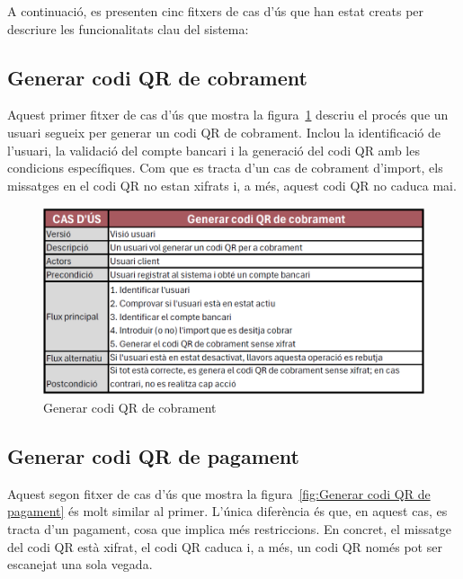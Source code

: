 \documentclass[a4paper,12pt,twoside]{ThesisStyle}
\begin{document}
A continuació, es presenten cinc fitxers de cas d'ús que han estat creats per descriure les funcionalitats clau del sistema:

\subsection{Generar codi QR de cobrament}
\label{subsec:Generar codi QR de cobrament}

Aquest primer fitxer de cas d'ús que mostra la figura~\ref{fig:Generar codi QR de cobrament} descriu el procés que un usuari segueix per generar un codi QR de cobrament. Inclou la identificació de l'usuari, la validació del compte bancari i la generació del codi QR amb les condicions específiques. Com que es tracta d'un cas de cobrament d'import, els missatges en el codi QR no estan xifrats i, a més, aquest codi QR no caduca mai.


\begin{figure}[h]
    \centering
    \includegraphics[width=1\textwidth]{imatges/f1.png}
    \caption{Generar codi QR de cobrament}
    \label{fig:Generar codi QR de cobrament}
\end{figure}

\clearpage
\subsection{Generar codi QR de pagament}
\label{subsec:Generar codi QR de pagament}

Aquest segon fitxer de cas d'ús que mostra la figura~\ref{fig:Generar codi QR de pagament} és molt similar al primer. L'única diferència és que, en aquest cas, es tracta d'un pagament, cosa que implica més restriccions. En concret, el missatge del codi QR està xifrat, el codi QR caduca i, a més, un codi QR només pot ser escanejat una sola vegada.
\end{document}
